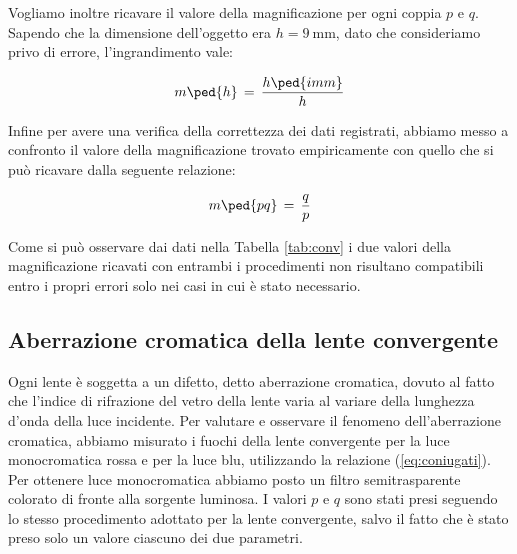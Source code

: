 Vogliamo inoltre ricavare il valore della magnificazione per ogni coppia $p$ e $q$.
Sapendo che la dimensione dell'oggetto era $h = \SI{9}{\milli\metre}$, dato che consideriamo privo di errore, l'ingrandimento vale: 

\begin{equation}
    m\ped{h} \,=\, \frac{h \ped{imm}}{h}
\end{equation}

Infine per avere una verifica della correttezza dei dati registrati, abbiamo messo a confronto il valore della magnificazione trovato empiricamente con quello che si può ricavare dalla seguente relazione:

\begin{equation}
    m\ped{pq} \,=\, \frac{q}{p}
\end{equation}



Come si può osservare dai dati nella Tabella \ref{tab:conv} i due valori della magnificazione ricavati con entrambi i procedimenti non risultano compatibili entro i propri errori solo nei casi in cui è stato necessario.

\subsection{Aberrazione cromatica della lente convergente}

Ogni lente è soggetta a un difetto, detto aberrazione cromatica, dovuto al fatto che l'indice di rifrazione del vetro della lente varia al variare della lunghezza d'onda della luce incidente.
Per valutare e osservare il fenomeno dell'aberrazione cromatica, abbiamo misurato i fuochi della lente convergente per la luce monocromatica rossa e per la luce blu, utilizzando la relazione (\ref{eq:coniugati}).
Per ottenere luce monocromatica abbiamo posto un filtro semitrasparente colorato di fronte alla sorgente luminosa. I valori $p$ e $q$ sono stati presi seguendo lo stesso procedimento adottato per la lente convergente, salvo il fatto che è stato preso solo un valore ciascuno dei due parametri.

